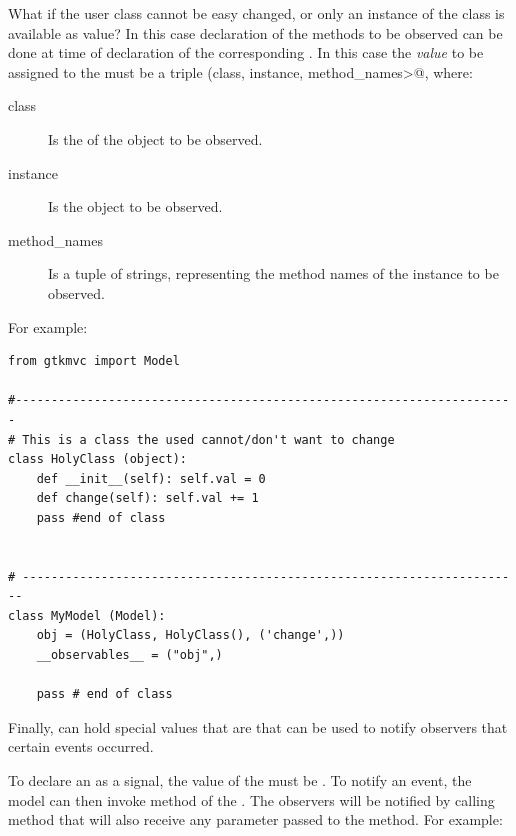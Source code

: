 \vspace{4mm}
What if the user class cannot be easy changed, or only an instance of
the class is available as \OP value? In this case declaration of the
methods to be observed can be done at time of declaration of the
corresponding \OP. In this case the \emph{value} to be assigned to the
\OP must be a triple \verb@(class, instance, method_names>@, where:
\begin{description}
\item[class] Is the  of the object to be observed.
\item[instance] Is the object to be observed.
\item[method\_names] Is a tuple of strings, representing the method
  names of the instance to be observed.
\end{description}

For example:
{ \codesize 
\begin{verbatim} 
from gtkmvc import Model

#----------------------------------------------------------------------
# This is a class the used cannot/don't want to change
class HolyClass (object):    
    def __init__(self): self.val = 0 
    def change(self): self.val += 1
    pass #end of class


# ----------------------------------------------------------------------
class MyModel (Model):
    obj = (HolyClass, HolyClass(), ('change',))
    __observables__ = ("obj",)

    pass # end of class
\end{verbatim}
}



\vspace{4mm}
Finally, \OP can hold special values that are  that can be
used to notify observers that certain events occurred. 

To declare an \OP as a signal, the value of the \OP must be
. To notify an event, the model
can then invoke method  of the \OP. The observers will
be notified by calling method
 that will also receive any
parameter passed to the  method. For example:

